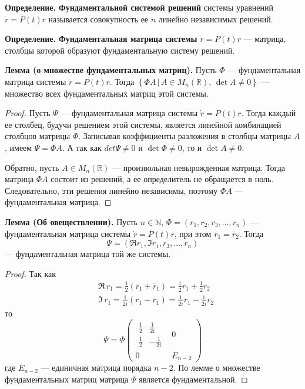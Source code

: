 \noindent \textbf{Определение.} \textbf{Фундаментальной системой решений} системы уравнений $\dot{r} = P(t)r$ называется совокупность ее $n$ линейно независимых решений.

\noindent \textbf{Определение.} \textbf{Фундаментальная матрица системы} $\dot{r} = P(t)r$ --- матрица, столбцы которой образуют фундаментальную систему решений.

\noindent \textbf{Лемма (о множестве фундаментальных матриц).} Пусть $\Phi$ --- фундаментальная матрица системы $\dot{r} = P(t)r$. Тогда $\left\{\Phi A \, | \, A \in M_n(\mathbb{R}), \, \det A \neq 0 \right\}$ --- множество всех фундаментальных матриц этой системы.

\begin{proof}
    Пусть $\Psi$ --- фундаментальная матрица системы $\dot{r} = P(t)r$. Тогда каждый ее столбец, будучи решением этой системы, является линейной комбинацией столбцов матрицы $\Phi$. Записывая коэффициенты разложения в столбцы матрицы $A$, имеем $\Psi = \Phi A$. А так как $det \Psi \neq 0$ и $\det \Phi \neq 0$, то и $\det A \neq 0$.

    Обратно, пусть $A \in M_n(\mathbb{R})$ --- произвольная невырожденная матрица. Тогда матрица $\Phi A$ состоит из решений, а ее определитель не обращается в ноль. Следовательно, эти решения линейно независимы, поэтому $\Phi A$ --- фундаментальная матрица.
\end{proof}

\noindent \textbf{Лемма (Об овеществлении).} Пусть $n \in \mathbb{N}$, $\Phi = (r_1,r_2,r_3,\ldots,r_n)$ --- фундаментальная матрица системы $\dot{r} = P(t)r$, при этом $r_1 = \overline{r}_2$. Тогда
\begin{equation*}
    \Psi = (\Re r_1, \Im r_1, r_3, \ldots, r_n)
\end{equation*}
--- фундаментальная матрица той же системы.

\begin{proof}
    Так как
    \begin{equation*}
        \begin{aligned}
             & \Re\, r_1 = \frac{1}{2}(r_1 + \overline{r}_1) = \frac{1}{2}r_1 + \frac{1}{2}r_2   \\
             & \Im\,r_1 = \frac{1}{2i}(r_1 - \overline{r}_1) = \frac{1}{2i}r_1 - \frac{1}{2i}r_2
        \end{aligned}
    \end{equation*}
    то
    \begin{equation*}
        \Psi = \Phi \begin{pmatrix}
            \begin{matrix}
                \frac{1}{2} & \frac{1}{2i}  \\
                \frac{1}{2} & -\frac{1}{2i}
            \end{matrix} & 0       \\
            0                          & E_{n-2}
        \end{pmatrix}
    \end{equation*}
    где $E_{n-2}$ --- единичная матрица порядка $n - 2$. По лемме о множестве фундаментальных матриц матрица $\Psi$ является фундаментальной.
\end{proof}

